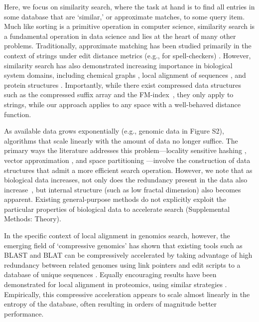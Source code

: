 \documentclass[review,preprint,12pt]{elsarticle}
\renewcommand{\cite}{\citep} %
\theoremstyle{definition}
\theoremstyle{remark}
\numberwithin{equation}{section}
\begin{document}
Here, we focus on similarity search, where the task at hand is to find all entries in some database that are `similar,' or approximate matches, to some query item.
Much like sorting is a primitive operation in computer science, similarity search is a fundamental operation in data science and lies at the heart of many other problems.
Traditionally, approximate matching has been studied primarily in the context of strings under edit distance metrics (e.g., for spell-checkers) \cite{ukkonen1985algorithms}.
However, similarity search has also demonstrated increasing importance in biological system domains, including chemical graphs \cite{schaeffer2007graph}, local alignment of sequences \cite{altschul1990basic, kent2002blat}, and protein structures \cite{budowski2010fragbag}.
Importantly, while there exist compressed data structures such as the 
compressed suffix array and the FM-index~\cite{grossi2005compressed, ferragina2000opportunistic}, they only apply to strings, while our approach 
applies to any space with a well-behaved distance function.

As available data grows exponentially \cite{berger2013computational,yu2015quality} (e.g., genomic data in Figure S2), 
algorithms that scale linearly with the amount of data no longer suffice.
The primary ways the literature addresses this problem---locality sensitive 
hashing \cite{indyk1998approximate}, vector approximation 
\cite{ferhatosmanoglu2000vector}, and space partitioning 
\cite{weber1998quantitative}---involve the construction of data structures that admit a more efficient search operation.
However, we note that as biological data increases, not only does the redundancy present in the data also increase~\cite{loh2012compressive}, but 
internal structure (such as low fractal dimension) also becomes apparent.
Existing general-purpose methods do not explicitly exploit the particular 
properties of biological data to accelerate search (Supplemental Methods: 
Theory).

In the specific context of local alignment in genomics search, however, the emerging field of `compressive genomics' has shown that existing tools such as BLAST and BLAT can be compressively accelerated by taking advantage of high redundancy between related genomes using link pointers and edit scripts to a database of unique sequences \cite{loh2012compressive}.
Equally encouraging results have been demonstrated for local alignment in 
proteomics, using similar strategies \cite{daniels2013compressive}.
Empirically, this compressive acceleration appears to scale almost linearly in the entropy of the database, often resulting in orders of magnitude better performance.
\end{document}
